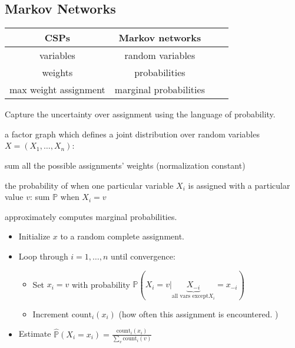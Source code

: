 \subsection{Markov Networks}

\begin{tabular}{|c|c|c|c|} 
    \hline
    \textbf{CSPs} & \textbf{Markov networks} \\
    \hline
    variables & random variables \\ 
    \hline
    weights & probabilities \\
    \hline
    max weight assignment & marginal probabilities \\
    \hline
\end{tabular}

Capture the uncertainty over assignment using the language of probability.

 a factor graph which defines a joint distribution over
random variables $X = (X_1,\dots,X_n)$:

 sum all the possible assignments'
weights (normalization constant)

 the probability of when one particular variable
$X_i$ is assigned with a particular value $v$: sum $\mathbb{P}$ when $X_i = v$

 approximately computes marginal probabilities.

\begin{itemize}
    \item Initialize $x$ to a random complete assignment.
    \item Loop through $i=1,\dots,n$ until convergence: \begin{itemize}
        \item Set $x_i = v$ with probability $\mathbb{P}(X_i = v | \underbrace{X_{-i}}_{\text{all vars except} X_i}=x_{-i})$
        \item Increment $\text{count}_i(x_i)$ (how often this assignment is encountered. )
    \end{itemize}
    \item Estimate $\hat{\mathbb{P}}(X_i=x_i)=\frac{\text{count}_i(x_i)}{\sum_{v}\text{count}_i(v)}$
\end{itemize}

